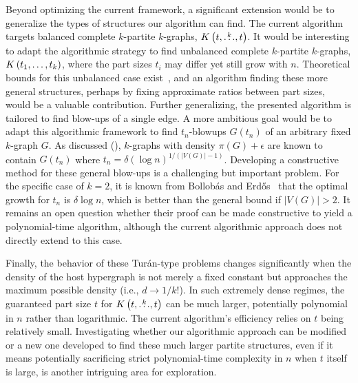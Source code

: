 Beyond optimizing the current framework, a significant extension would be to generalize the types
of structures our algorithm can find.
The current algorithm targets balanced complete $k$-partite $k$-graphs, $K\left(t, \overset{k}{\dots}, t\right)$.
It would be interesting to adapt the algorithmic strategy to find unbalanced complete $k$-partite $k$-graphs, $
K\left(t_1, \dots, t_k\right)$, where the part sizes $t_i$ may differ yet still grow with $n$.
Theoretical bounds for this unbalanced case
exist~\cite{carvajal2024canonical}, and an algorithm finding these more general structures,
perhaps by fixing approximate ratios between part sizes, would be a valuable contribution.
Further generalizing, the presented algorithm is tailored to find blow-ups of a single edge.
A more ambitious goal would be to adapt this algorithmic framework to find $t_n$-blowups $G(t_n)$
of an arbitrary fixed $k$-graph $G$.
As discussed (),
$k$-graphs with density $\pi(G) + \epsilon$ are known to contain $G(t_n)$ where $t_n = \delta (\log n)^{1/(|V(G)|-1)}$.
Developing a constructive method for these general blow-ups is a challenging but important problem.
For the specific case of $k=2$, it is known from Bollobás and Erd\H{o}s~\cite{bollobas1973structure}
that the optimal growth for $t_n$ is $\delta \log n$, which is better than the general bound if $|V(G)| > 2$.
It remains an open question whether their proof can be made constructive to yield a polynomial-time algorithm,
although the current algorithmic approach does not directly extend to this case.

Finally, the behavior of these Turán-type problems changes significantly when the density of the host hypergraph
is not merely a fixed constant but approaches the maximum possible density (i.e., $d \to 1/k!$).
In such extremely dense regimes, the guaranteed part size $t$ for $K\left(t, \overset{k}{\dots}, t\right)$ can be much larger,
potentially polynomial in $n$ rather than logarithmic.
The current algorithm's efficiency relies on $t$ being relatively small.
Investigating whether our algorithmic approach can be modified or a new one developed to find these
much larger partite structures, even if it means potentially sacrificing strict polynomial-time complexity in $n$ when $t$
itself is large, is another intriguing area for exploration.
